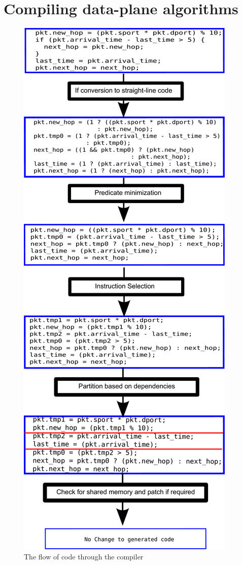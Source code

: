 \section{Compiling data-plane algorithms}
\label{s:compiler}

\begin{figure}
\includegraphics[width=\columnwidth]{compiler_flow.pdf}
\caption{The flow of code through the compiler}
\end{figure}


